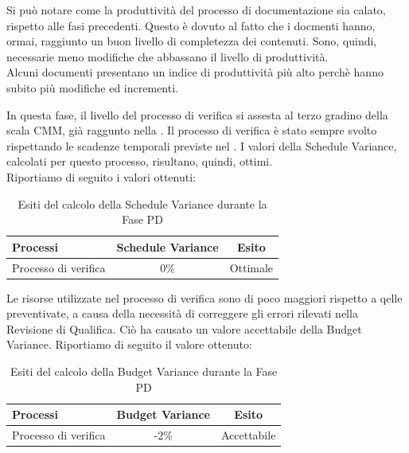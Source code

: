 			Si può notare come la produttività del processo di documentazione sia calato, rispetto alle fasi precedenti. Questo è dovuto al fatto che i docmenti hanno, ormai, raggiunto un buon livello di completezza dei contenuti. Sono, quindi, necessarie meno modifiche che abbassano il livello di produttività. \\
			Alcuni documenti presentano un indice di produttività più alto perchè hanno subito più modifiche ed incrementi.

			In questa fase, il livello del processo di verifica si assesta al terzo gradino della scala CMM, già raggunto nella .
			Il processo di verifica è stato sempre svolto rispettando le scadenze temporali previste nel . I valori della Schedule Variance, calcolati per questo processo, risultano, quindi, ottimi.\\
			Riportiamo di seguito i valori ottenuti:
			\begin{table}[H]
				\centering
				\begin{tabu}{| l | c | c |}
					\hline
						Processi 			& Schedule Variance	& Esito		\\ \hline \hline
						Processo di verifica & 0\% & Ottimale \\ \hline
				\end{tabu}
				\caption{Esiti del calcolo della Schedule Variance durante la Fase PD}
			\end{table}	

			Le risorse utilizzate nel processo di verifica sono di poco maggiori rispetto a qelle preventivate, a causa della necessità di correggere gli errori rilevati nella Revisione di Qualifica. Ciò ha causato un valore accettabile della Budget Variance.
			Riportiamo di seguito il valore ottenuto:
			\begin{table}[H]
				\centering
				\begin{tabu}{| l | c | c |}
				\hline
				Processi 			& Budget Variance	& Esito		\\ \hline \hline
				Processo di verifica & -2\% & Accettabile \\ \hline
				\end{tabu}
				\caption{Esiti del calcolo della Budget Variance durante la Fase PD}
			\end{table}	

